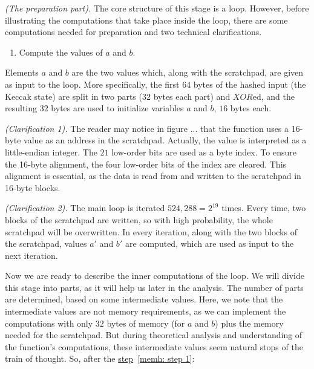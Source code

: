 \noindent \emph{(The preparation part).} The core structure of this stage is a loop. However, before illustrating the computations that take place inside the loop, there are some computations needed for preparation and two technical clarifications.

\begin{enumerate}
  \item \label{memh: step 1} Compute the values of $a$ and $b$.
\end{enumerate}
Elements $a$ and $b$ are the two values which, along with the scratchpad, are given as input to the loop. More specifically, the first $64$ bytes of the hashed input (the Keccak state) are split in two parts ($32$ bytes each part) and $XOR$ed, and the resulting $32$ bytes are used to initialize variables $a$ and $b$, $16$ bytes each.

\noindent \emph{(Clarification 1).} The reader may notice in figure ... that the function uses a 16-byte value as an address in the scratchpad. Actually, the value is interpreted as a little-endian integer. The $21$ low-order bits are used as a byte index. To ensure the 16-byte alignment, the four low-order bits of the index are cleared. This alignment is essential, as the data is read from and written to the scratchpad in 16-byte blocks.

\noindent \emph{(Clarification 2).} The main loop is iterated $524,288 = 2^{19}$ times. Every time, two blocks of the scratchpad are written, so with high probability, the whole scratchpad will be overwritten. In every iteration, along with the two blocks of the scratchpad, values $a'$ and $b'$ are computed, which are used as input to the next iteration.

Now we are ready to describe the inner computations of the loop. We will divide this stage into parts, as it will help us later in the analysis. The number of parts are determined, based on some intermediate values. Here, we note that the intermediate values are not memory requirements, as we can implement the computations with only $32$ bytes of memory (for $a$ and $b$) plus the memory needed for the scratchpad. But during theoretical analysis and understanding of the function's computations, these intermediate values seem natural stops of the train of thought. So, after the \hyperref[memh: step 1]{step}~\ref{memh: step 1}:

